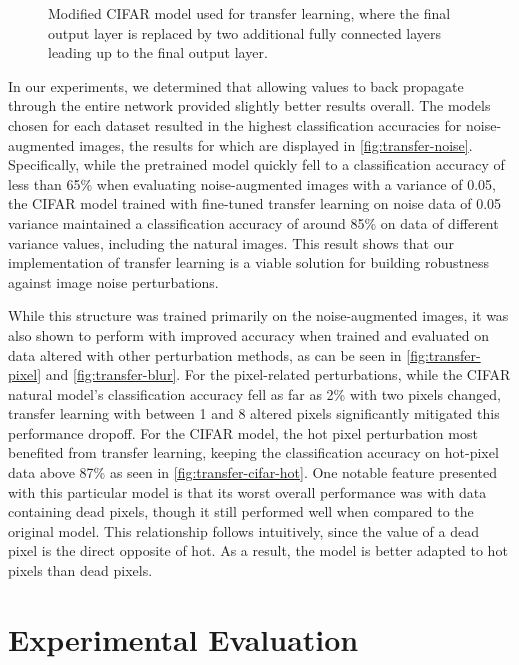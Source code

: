 \documentclass[conference]{IEEEtran}
\begin{document}
\begin{figure}[H]
	\centering
	
	\captionsetup{width=1\linewidth}
	\caption{Modified CIFAR model used for transfer learning, where the final output layer is replaced by two additional fully connected layers leading up to the final output layer.}
	\label{fig:transfer_learn}
\end{figure}

In our experiments, we determined that allowing values to back propagate through the entire network provided slightly better results overall. The models chosen for each dataset resulted in the highest classification accuracies for noise-augmented images, the results for which are displayed in \autoref{fig:transfer-noise}. Specifically, while the pretrained model quickly fell to a classification accuracy of less than 65\% when evaluating noise-augmented images with a variance of 0.05, the CIFAR model trained with fine-tuned transfer learning on noise data of 0.05 variance maintained a classification accuracy of around 85\% on data of different variance values, including the natural images. This result shows that our implementation of transfer learning is a viable solution for building robustness against image noise perturbations.

While this structure was trained primarily on the noise-augmented images, it was also shown to perform with improved accuracy when trained and evaluated on data altered with other perturbation methods, as can be seen in \autoref{fig:transfer-pixel} and \autoref{fig:transfer-blur}. For the pixel-related perturbations, while the CIFAR natural model’s classification accuracy fell as far as 2\% with two pixels changed, transfer learning with between 1 and 8 altered pixels significantly mitigated this performance dropoff. For the CIFAR model, the hot pixel perturbation most benefited from transfer learning, keeping the classification accuracy on hot-pixel data above 87\% as seen in \autoref{fig:transfer-cifar-hot}. One notable feature presented with this particular model is that its worst overall performance was with data containing dead pixels, though it still performed well when compared to the original model. This relationship follows intuitively, since the value of a dead pixel is the direct opposite of hot. As a result, the model is better adapted to hot pixels than dead pixels.

\section{Experimental Evaluation}
\end{document}
